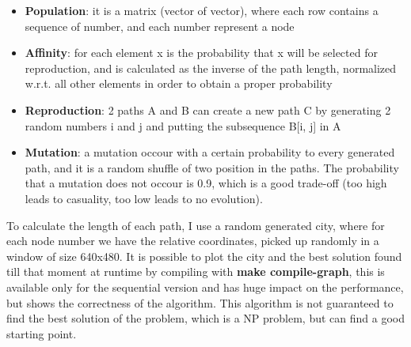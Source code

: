 \documentclass{article}
\begin{document}
	\begin{itemize}
	    \item \textbf{Population}: it is a matrix (vector of vector), where each row contains a sequence of number, and each number represent a node
	    \item \textbf{Affinity}: for each element x is the probability that x will be selected for reproduction, and is calculated as the inverse of the path length, normalized w.r.t. all other elements in order to obtain a proper probability
	    \item \textbf{Reproduction}: 2 paths A and B can create a new path C by generating 2 random numbers i and j and putting the subsequence B[i, j] in A
	    \item \textbf{Mutation}: a mutation occour with a certain probability to every generated path, and it is a random shuffle of two position in the paths. The probability that a mutation does not occour is 0.9, which is a good trade-off (too high leads to casuality, too low leads to no evolution).
	\end{itemize}
	To calculate the length of each path, I use a random generated city, where for each node number we have the relative coordinates, picked up randomly in a window of size 640x480. It is possible to plot the city and the best solution found till that moment at runtime by compiling with \textbf{make compile-graph}, this is available only for the sequential version and has huge impact on the performance, but shows the correctness of the algorithm. This algorithm is not guaranteed to find the best solution of the problem, which is a NP problem, but can find a good starting point.
\end{document}

